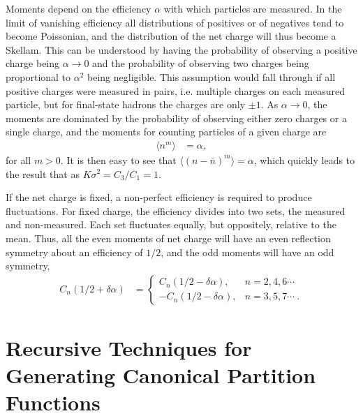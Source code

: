 \documentclass[aps,prc,nofootinbib,showpacs,superscriptaddress,groupedaddress]{revtex4-1}
\begin{document}
Moments depend on the efficiency $\alpha$ with which particles are measured. In the limit of vanishing efficiency all distributions of positives or of negatives tend to become Poissonian, and the distribution of the net charge will thus become a Skellam.  This can be understood by having the probability of observing a positive charge being $\alpha\rightarrow 0$ and the probability of observing two charges being proportional to $\alpha^2$ being negligible. This assumption would fall through if all positive charges were measured in pairs, i.e. multiple charges on each measured particle, but for final-state hadrons the charges are only $\pm 1$. As $\alpha\rightarrow 0$, the moments are dominated by the probability of observing either zero charges or a single charge, and the moments for counting particles of a given charge are
\begin{eqnarray}
\langle n^m\rangle&=\alpha,
\end{eqnarray}
for all $m>0$. It is then easy to see that $\langle (n-\bar{n})^m\rangle=\alpha$, which quickly leads to the result that as $K\sigma^2=C_3/C_1=1$.

If the net charge is fixed, a non-perfect efficiency is required to produce fluctuations. For fixed charge, the efficiency divides into two sets, the measured and non-measured. Each set fluctuates equally, but oppositely, relative to the mean. Thus, all the even moments of net charge will have an even reflection symmetry about an efficiency of $1/2$, and the odd moments will have an odd symmetry,
\begin{eqnarray}
\label{eq:alphasymm}
C_n(1/2+\delta\alpha)&=\left\{\begin{array}{rl}
C_n(1/2-\delta\alpha),&n=2,4,6\cdots\\
-C_n(1/2-\delta\alpha),&n=3,5,7\cdots~.\end{array}\right.
\end{eqnarray}

\section{Recursive Techniques for Generating Canonical Partition Functions}\label{sec:theoryexact}
\end{document}
